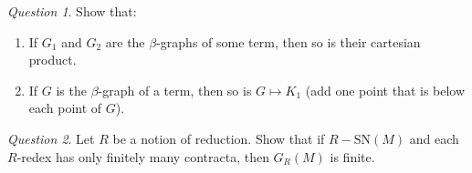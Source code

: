 \documentclass[11pt]{article}
\theoremstyle{definition}
\theoremstyle{remark}
\theoremstyle{remark}
\newtheorem{question}{Question}
\theoremstyle{definition}
\begin{document}
\begin{question}
  Show that:
  \begin{enumerate}
    \item If $G_1$ and $G_2$ are the $\beta$-graphs of some term, then so is
          their cartesian product.
    \item If $G$ is the $\beta$-graph of a term, then so is $G \mapsto K_1$ (add
          one point that is below each point of $G$).
  \end{enumerate}
\end{question}

\begin{question}
  Let $R$ be a notion of reduction. Show that if $R-\mathrm{SN}(M)$ and each
  $R$-redex has only finitely many contracta, then $G_R(M)$ is finite.
\end{question}

\printbibliography
\end{document}
